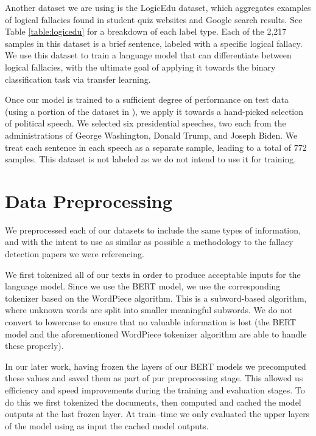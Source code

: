 \documentclass[conference]{IEEEtran}
\begin{document}
Another dataset we are using is the LogicEdu dataset\cite{jin2022logical}, which aggregates examples of logical fallacies found in student quiz websites and Google search results. See Table \ref{table:logicedu} for a breakdown of each label type. Each of the 2,217 samples in this dataset is a brief sentence, labeled with a specific logical fallacy. We use this dataset to train a language model that can differentiate between logical fallacies, with the ultimate goal of applying it towards the binary classification task via transfer learning.

Once our model is trained to a sufficient degree of performance on test data (using a portion of the dataset in \cite{Proppy}), we apply it towards a hand-picked selection of political speech. We selected six presidential speeches, two each from the administrations of George Washington, Donald Trump, and Joseph Biden. We treat each sentence in each speech as a separate sample, leading to a total of 772 samples. This dataset is not labeled as we do not intend to use it for training.


\section{Data Preprocessing}

We preprocessed each of our datasets to include the same types of information, and with the intent to use as similar as possible a methodology to the fallacy detection papers we were referencing.

We first tokenized all of our texts in order to produce acceptable inputs for the language model. Since we use the BERT model, we use the corresponding tokenizer based on the WordPiece algorithm\cite{wordpiecetokenizer}. This is a subword-based algorithm, where unknown words are split into smaller meaningful subwords. We do not convert to lowercase to ensure that no valuable information is lost (the BERT model and the aforementioned WordPiece tokenizer algorithm are able to handle these properly).

    In our later work, having frozen the layers of our BERT models we precomputed these values and saved them as part of pur preprocessing stage. This allowed us efficiency and speed improvements during the training and evaluation stages. To do this we first tokenized the documents, then computed and cached the model outputs at the last frozen layer. At train–time we only evaluated the upper layers of the model using as input the cached model outputs. 
\end{document}
